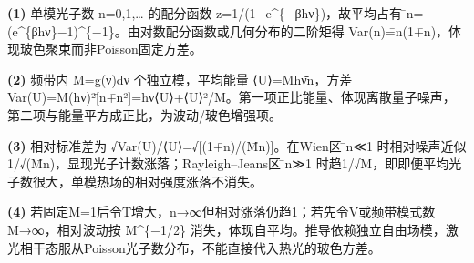 \par\noindent\textbf{(1)} 单模光子数 n=0,1,… 的配分函数 z=1/(1−e\textasciicircum{}\{−βhν\})，故平均占有 ̄n=(e\textasciicircum{}\{βhν\}−1)\textasciicircum{}\{−1\}。由对数配分函数或几何分布的二阶矩得 Var(n)=̄n(1+̄n)，体现玻色聚束而非Poisson固定方差。
\par\noindent\textbf{(2)} 频带内 M=g(ν)dν 个独立模，平均能量 ⟨U⟩=Mhν̄n，方差 Var(U)=M(hν)²[̄n+̄n²]=hν⟨U⟩+⟨U⟩²/M。第一项正比能量、体现离散量子噪声，第二项与能量平方成正比，为波动/玻色增强项。
\par\noindent\textbf{(3)} 相对标准差为 √Var(U)/⟨U⟩=√[(1+̄n)/(M̄n)]。在Wien区 ̄n≪1 时相对噪声近似1/√(M̄n)，显现光子计数涨落；Rayleigh–Jeans区 ̄n≫1 时趋1/√M，即即便平均光子数很大，单模热场的相对强度涨落不消失。
\par\noindent\textbf{(4)} 若固定M=1后令T增大，̄n→∞但相对涨落仍趋1；若先令V或频带模式数M→∞，相对波动按 M\textasciicircum{}\{−1/2\} 消失，体现自平均。推导依赖独立自由场模，激光相干态服从Poisson光子数分布，不能直接代入热光的玻色方差。
